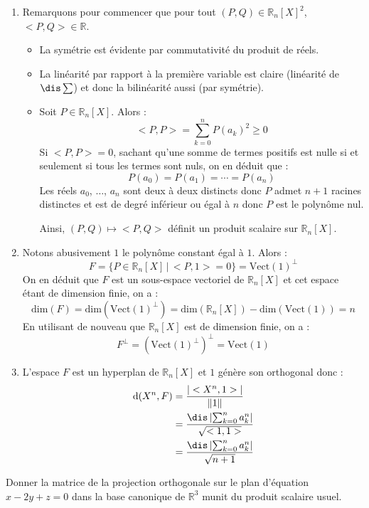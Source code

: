 \documentclass[a4paper,10pt]{report}
\begin{document}
\corr \begin{enumerate}
\item Remarquons pour commencer que pour tout $(P,Q) \in \mathbb{R}_n[X]^2$, $<P,Q> \in \mathbb{R}$.
\begin{itemize}
\item La symétrie est évidente par commutativité du produit de réels.
\item La linéarité par rapport à la première variable est claire (linéarité de $\dis \sum$) et donc la bilinéarité aussi (par symétrie).
\item Soit $P \in \mathbb{R}_n[X]$. Alors :
$$ <P,P> =  \sum_{k=0}^n P(a_k)^2 \geq 0$$
Si $<P,P>=0$, sachant qu'une somme de termes positifs est nulle si et seulement si tous les termes sont nuls, on en déduit que :
$$ P(a_0)= P(a_1) = \cdots = P(a_n)$$
Les réels $a_0$, $\ldots$, $a_n$ sont deux à deux distincts donc $P$ admet $n+1$ racines distinctes et est de degré inférieur ou égal à $n$ donc $P$ est le polynôme nul.

\medskip

\noindent Ainsi, $(P,Q) \mapsto <P,Q>$ définit un produit scalaire sur $\mathbb{R}_n[X]$.
\end{itemize}
\item Notons abusivement $1$ le polynôme constant égal à $1$. Alors :
$$ F = \lbrace P \in \mathbb{R}_n[X] \, \vert \, <P,1>= 0 \rbrace = \textrm{Vect}(1)^{\perp}$$
On en déduit que $F$ est un sous-espace vectoriel de $ \mathbb{R}_n[X]$ et cet espace étant de dimension finie, on a :
$$ \textrm{dim}(F) =  \textrm{dim}(\textrm{Vect}(1)^{\perp}) =  \textrm{dim}(\mathbb{R}_n[X]) -  \textrm{dim}(\textrm{Vect}(1)) = n$$
En utilisant de nouveau que $ \mathbb{R}_n[X]$ est de dimension finie, on a :
$$ F^{\perp} = (\textrm{Vect}(1)^{\perp})^{\perp} = \textrm{Vect}(1)$$
\item L'espace $F$ est un hyperplan de $\mathbb{R}_n[X]$ et $1$ génère son orthogonal donc :
\begin{align*}
\textrm{d}(X^n, F) & = \dfrac{\vert <X^n,1> \vert}{\Vert 1 \Vert} \\
& = \dfrac{\dis\left\vert \sum_{k=0}^n a_k^n \right\vert }{\sqrt{<1,1>}} \\
& = \dfrac{\dis\left\vert \sum_{k=0}^n a_k^n \right\vert }{\sqrt{n+1}} 
\end{align*}
\end{enumerate}

\begin{Exercice}{} Donner la matrice de la projection orthogonale sur le plan d'équation $x-2y+z=0$ dans la base canonique de $\mathbb{R}^3$ munit du produit scalaire usuel.
\end{Exercice}
\end{document}
